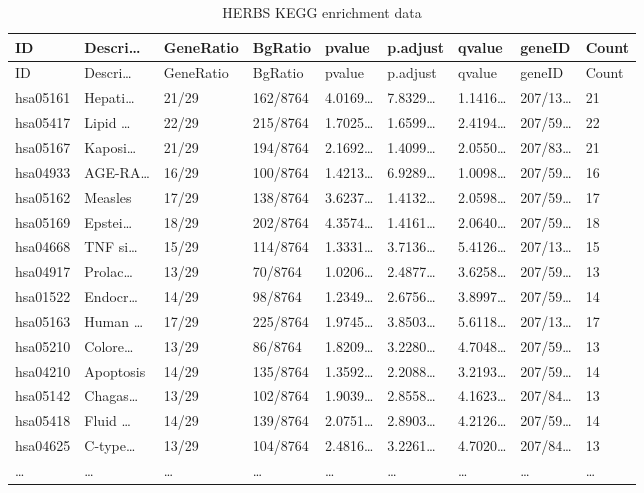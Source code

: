 \documentclass[
]{article}
\begin{document}
\begin{longtable}[]{@{}lllllllll@{}}
\caption{\label{tab:HERBS-KEGG-enrichment-data}HERBS KEGG enrichment data}\tabularnewline
\toprule
ID & Descri\ldots{} & GeneRatio & BgRatio & pvalue & p.adjust & qvalue & geneID & Count\tabularnewline
\midrule
\endfirsthead
\toprule
ID & Descri\ldots{} & GeneRatio & BgRatio & pvalue & p.adjust & qvalue & geneID & Count\tabularnewline
\midrule
\endhead
hsa05161 & Hepati\ldots{} & 21/29 & 162/8764 & 4.0169\ldots{} & 7.8329\ldots{} & 1.1416\ldots{} & 207/13\ldots{} & 21\tabularnewline
hsa05417 & Lipid \ldots{} & 22/29 & 215/8764 & 1.7025\ldots{} & 1.6599\ldots{} & 2.4194\ldots{} & 207/59\ldots{} & 22\tabularnewline
hsa05167 & Kaposi\ldots{} & 21/29 & 194/8764 & 2.1692\ldots{} & 1.4099\ldots{} & 2.0550\ldots{} & 207/83\ldots{} & 21\tabularnewline
hsa04933 & AGE-RA\ldots{} & 16/29 & 100/8764 & 1.4213\ldots{} & 6.9289\ldots{} & 1.0098\ldots{} & 207/59\ldots{} & 16\tabularnewline
hsa05162 & Measles & 17/29 & 138/8764 & 3.6237\ldots{} & 1.4132\ldots{} & 2.0598\ldots{} & 207/59\ldots{} & 17\tabularnewline
hsa05169 & Epstei\ldots{} & 18/29 & 202/8764 & 4.3574\ldots{} & 1.4161\ldots{} & 2.0640\ldots{} & 207/59\ldots{} & 18\tabularnewline
hsa04668 & TNF si\ldots{} & 15/29 & 114/8764 & 1.3331\ldots{} & 3.7136\ldots{} & 5.4126\ldots{} & 207/13\ldots{} & 15\tabularnewline
hsa04917 & Prolac\ldots{} & 13/29 & 70/8764 & 1.0206\ldots{} & 2.4877\ldots{} & 3.6258\ldots{} & 207/59\ldots{} & 13\tabularnewline
hsa01522 & Endocr\ldots{} & 14/29 & 98/8764 & 1.2349\ldots{} & 2.6756\ldots{} & 3.8997\ldots{} & 207/59\ldots{} & 14\tabularnewline
hsa05163 & Human \ldots{} & 17/29 & 225/8764 & 1.9745\ldots{} & 3.8503\ldots{} & 5.6118\ldots{} & 207/13\ldots{} & 17\tabularnewline
hsa05210 & Colore\ldots{} & 13/29 & 86/8764 & 1.8209\ldots{} & 3.2280\ldots{} & 4.7048\ldots{} & 207/59\ldots{} & 13\tabularnewline
hsa04210 & Apoptosis & 14/29 & 135/8764 & 1.3592\ldots{} & 2.2088\ldots{} & 3.2193\ldots{} & 207/59\ldots{} & 14\tabularnewline
hsa05142 & Chagas\ldots{} & 13/29 & 102/8764 & 1.9039\ldots{} & 2.8558\ldots{} & 4.1623\ldots{} & 207/84\ldots{} & 13\tabularnewline
hsa05418 & Fluid \ldots{} & 14/29 & 139/8764 & 2.0751\ldots{} & 2.8903\ldots{} & 4.2126\ldots{} & 207/59\ldots{} & 14\tabularnewline
hsa04625 & C-type\ldots{} & 13/29 & 104/8764 & 2.4816\ldots{} & 3.2261\ldots{} & 4.7020\ldots{} & 207/84\ldots{} & 13\tabularnewline
\ldots{} & \ldots{} & \ldots{} & \ldots{} & \ldots{} & \ldots{} & \ldots{} & \ldots{} & \ldots{}\tabularnewline
\bottomrule
\end{longtable}
\end{document}
